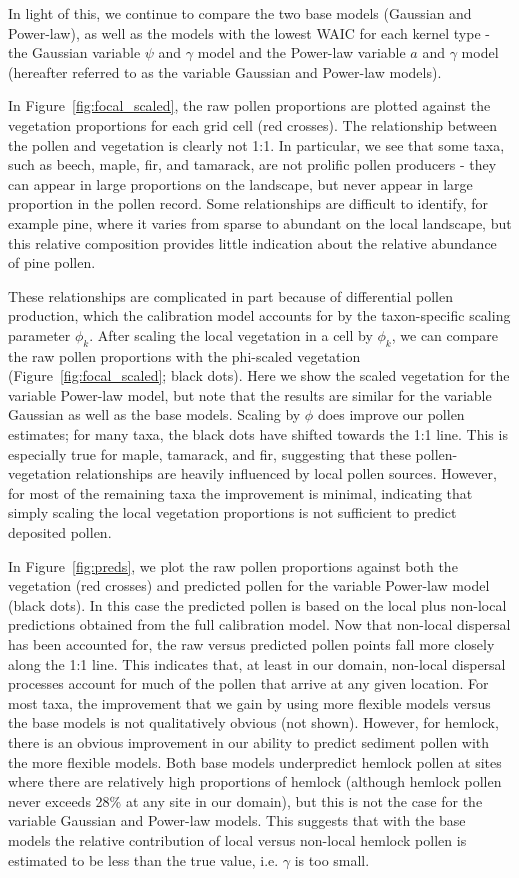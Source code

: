 \documentclass[12pt]{article}
\begin{document}
In light of this, we continue to compare the two base models (Gaussian
and Power-law), as well as the models with the lowest WAIC for each
kernel type - the Gaussian variable $\psi$ and $\gamma$ model and the
Power-law variable $a$ and $\gamma$ model (hereafter referred to as
the variable Gaussian and Power-law models).

In Figure~\ref{fig:focal_scaled}, the raw pollen proportions are
plotted against the vegetation proportions for each grid cell (red
crosses). The relationship between the pollen and vegetation is
clearly not 1:1. In particular, we see that some taxa, such as beech,
maple, fir, and tamarack, are not prolific pollen producers
- they can appear in large proportions on the landscape, but never
appear in large proportion in the pollen record. Some relationships
are difficult to identify, for example pine, where it varies from
sparse to abundant on the local landscape, but this relative
composition provides little indication about the relative abundance of
pine pollen.

These relationships are complicated in part because of differential
pollen production, which the calibration model accounts for by the
taxon-specific scaling parameter $\phi_k$. After scaling the local
vegetation in a cell by $\phi_k$, we can compare the raw pollen
proportions with the phi-scaled vegetation
(Figure~\ref{fig:focal_scaled}; black dots). Here we show the scaled
vegetation for the variable Power-law model, but note that the results
are similar for the variable Gaussian as well as the base
models. Scaling by $\phi$ does improve our pollen estimates; for many
taxa, the black dots have shifted towards the 1:1 line. This is
especially true for maple, tamarack, and fir, suggesting
that these pollen-vegetation relationships are heavily influenced by
local pollen sources. However, for most of the remaining taxa the
improvement is minimal, indicating that simply scaling the local
vegetation proportions is not sufficient to predict deposited pollen.

In Figure~\ref{fig:preds}, we plot the raw pollen proportions against
both the vegetation (red crosses) and predicted pollen for the
variable Power-law model (black dots). In this case the predicted
pollen is based on the local plus non-local predictions obtained from
the full calibration model. Now that non-local dispersal has been
accounted for, the raw versus predicted pollen points fall more
closely along the 1:1 line. This indicates that, at least in our
domain, non-local dispersal processes account for much of the pollen
that arrive at any given location. For most taxa, the improvement that
we gain by using more flexible models versus the base models is not
qualitatively obvious (not shown). However, for hemlock, there is an
obvious improvement in our ability to predict sediment pollen with the
more flexible models. Both base models underpredict hemlock pollen at
sites where there are relatively high proportions of hemlock (although
hemlock pollen never exceeds 28\% at any site in our domain), but this
is not the case for the variable Gaussian and Power-law models. This
suggests that with the base models the relative contribution of local
versus non-local hemlock pollen is estimated to be less than the true
value, i.e. $\gamma$ is too small.
\end{document}
